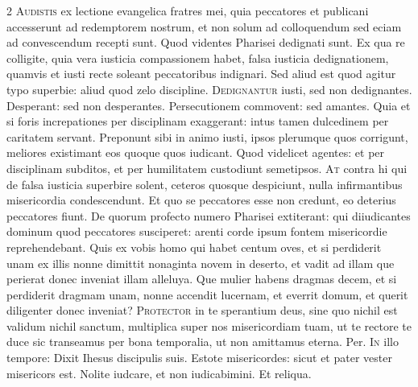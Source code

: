 \begin{multicols*}{2}
 \grecross
\lettrine[lines=2]{\zallmancaps \color{Red} A}{udistis} ex lectione evangelica fratres mei, quia peccatores et publicani accesserunt ad redemptorem nostrum, et non solum ad colloquendum sed eciam ad convescendum recepti sunt. Quod videntes Pharisei dedignati sunt. Ex qua re colligite, quia vera iusticia compassionem habet, falsa iusticia dedignationem, quamvis et iusti recte soleant peccatoribus indignari. Sed aliud est quod agitur typo superbie: aliud quod zelo discipline.
\lettrine[lines=2]{\zallmancaps \color{Blue} D}{edignantur} iusti, sed non dedignantes. Desperant: sed non desperantes. Persecutionem commovent: sed amantes. Quia et si foris increpationes per disciplinam exaggerant: intus tamen dulcedinem per caritatem servant. Preponunt sibi in animo iusti, ipsos plerumque quos corrigunt, meliores existimant eos quoque quos iudicant. Quod videlicet agentes: et per disciplinam subditos, et per humilitatem custodiunt semetipsos.
\lettrine[lines=2]{\zallmancaps \color{Red} A}{t} contra hi qui de falsa iusticia superbire solent, ceteros quosque despiciunt, nulla infirmantibus misericordia condescendunt. Et quo se peccatores esse non credunt, eo deterius peccatores fiunt. De quorum profecto numero Pharisei extiterant: qui diiudicantes dominum quod peccatores susciperet: arenti corde ipsum fontem misericordie reprehendebant.
 Quis ex vobis homo qui habet centum oves, et si perdiderit unam ex illis nonne dimittit nonaginta novem in deserto, et vadit ad illam que perierat donec inveniat illam alleluya.
 Que mulier habens dragmas decem, et si perdiderit dragmam unam, nonne accendit lucernam, et everrit domum, et querit diligenter donec inveniat?
\lettrine[lines=2]{\zallmancaps \color{Blue} P}{rotector} in te sperantium deus, sine quo nichil est validum nichil sanctum, multiplica super nos misericordiam tuam, ut te rectore te duce sic transeamus per bona temporalia, ut non amittamus eterna. Per.
\lettrine[lines=2]{\zallmancaps \color{Red} I}{n} illo tempore: Dixit Ihesus discipulis suis. Estote misericordes: sicut et pater vester misericors est. Nolite iudcare, et non iudicabimini. Et reliqua.

\end{multicols*}
